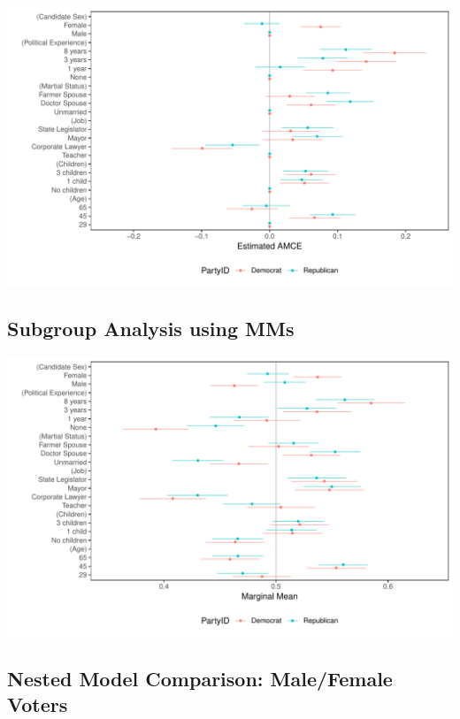 \documentclass[a4paper,12pt]{article}\usepackage[]{graphicx}\usepackage[]{color}
\makeatletter
\def\maxwidth{ %
  \ifdim\Gin@nat@width>\linewidth
    \linewidth
  \else
    \Gin@nat@width
  \fi
}
\newenvironment{knitrout}{}{} %
\makeatother
\begin{document}
\begin{knitrout}
\color{fgcolor}
\includegraphics[width=\maxwidth]{figure/tkr_subgroup_amce_appendix-1} 

\end{knitrout}

\subsection{Subgroup Analysis using MMs}

\begin{knitrout}
\color{fgcolor}
\includegraphics[width=\maxwidth]{figure/tkr_subgroup_mm_appendix-1} 

\end{knitrout}

\clearpage

\subsection{Nested Model Comparison: Male/Female Voters}
\end{document}
